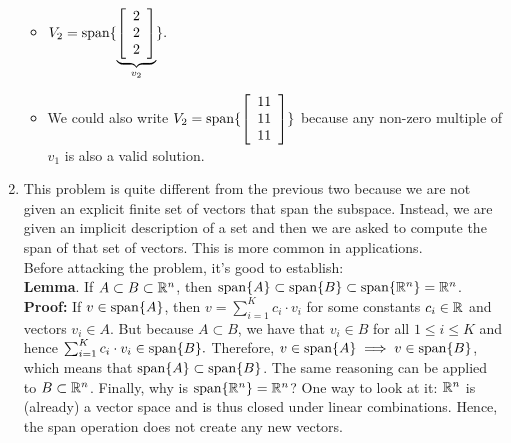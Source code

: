 \begin{enumerate}
\begin{itemize}
\item $V_2 = \mathrm{span} \{ \underbrace{\left[\begin{array}{c}  2\\
 2 \\  2\end{array}\right]}_{v_2}  \}.$

 \item We could also write $V_2 = \mathrm{span} \{  \left[\begin{array}{c}  11\\
11 \\ 11\end{array} \right]  \} $ because any non-zero multiple of $v_1$ is also a valid solution.

\end{itemize}



\item This problem is quite different from the previous two because we are not given an explicit finite set of vectors that span the subspace. Instead, we are given an implicit description of a set and then we are asked to compute the span of that set of vectors. This is more common in applications.  \\

Before attacking the problem, it's good to establish:\\

\textbf{Lemma}. If $A \subset B \subset \mathbb R^n$, then $ \mathrm{span} \{ A \} \subset \mathrm{span} \{ B \} \subset \mathrm{span} \{  \mathbb R^n \} = \mathbb R^n$. \\

\textbf{Proof:} If $v \in \mathrm{span} \{ A \}$, then $v = \sum_{i=1}^Kc_i\cdot v_i$ for some constants $c_i \in \mathbb R$ and vectors $ v_i\in A $. But because $A \subset B$, we have that  $ v_i\in B $ for all $1 \le i \le K$ and hence $\sum_{i=1}^Kc_i\cdot v_i \in \mathrm{span} \{ B \}.$ Therefore, $v \in \mathrm{span} \{ A \} \implies v \in \mathrm{span} \{ B \}$, which means that $ \mathrm{span} \{ A \} \subset \mathrm{span} \{ B \}$. The same reasoning can be applied to $B \subset \mathbb R^n$. Finally, why is $\mathrm{span} \{  \mathbb R^n \} = \mathbb R^n$? One way to look at it: $\mathbb R^n$ is (already) a vector space and is thus closed under linear combinations. Hence, the span operation does not create any new vectors. \Qed  \\


\end{enumerate}
